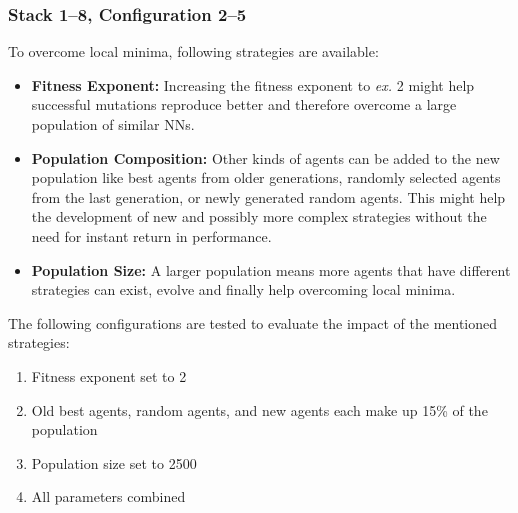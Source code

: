 \subsubsection{Stack 1--8, Configuration 2--5}
To overcome local minima, following strategies are available:
\begin{itemize}
    \item \textbf{Fitness Exponent:} Increasing the fitness exponent to \textit{ex.} 2 might help successful mutations reproduce better and therefore overcome a large population of similar NNs.
    \item \textbf{Population Composition:} Other kinds of agents can be added to the new population like best agents from older generations, randomly selected agents from the last generation, or newly generated random agents.
    This might help the development of new and possibly more complex strategies without the need for instant return in performance.
    \item \textbf{Population Size:} A larger population means more agents that have different strategies can exist, evolve and finally help overcoming local minima.
\end{itemize}
The following configurations are tested to evaluate the impact of the mentioned strategies:
\begin{enumerate}
    \item Fitness exponent set to 2
    \item Old best agents, random agents, and new agents each make up 15\% of the population
    \item Population size set to 2500
    \item All parameters combined
\end{enumerate}
